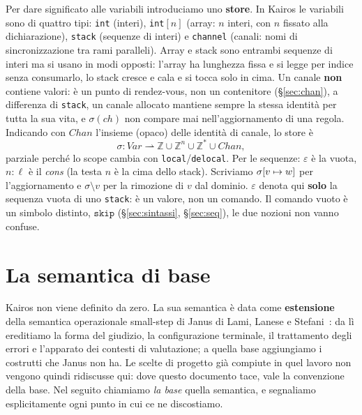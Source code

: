 \noindent
Per dare significato alle variabili introduciamo uno \textbf{store}. In Kairos
le variabili sono di quattro tipi: \texttt{int} (interi), \texttt{int}$[n]$
(array: $n$ interi, con $n$ fissato alla dichiarazione), \texttt{stack}
(sequenze di interi) e \texttt{channel} (canali: nomi di sincronizzazione tra
rami paralleli). Array e stack sono entrambi sequenze di interi ma si usano in
modi opposti: l'array ha lunghezza fissa e si legge per indice senza
consumarlo, lo stack cresce e cala e si tocca solo in cima. Un canale \textbf{non} contiene valori: è un punto di
rendez-vous, non un contenitore (\S\ref{sec:chan}), a differenza di
\texttt{stack}, un canale allocato mantiene sempre la stessa identità per
tutta la sua vita, e $\sigma(\mathit{ch})$ non compare mai
nell'aggiornamento di una regola. Indicando con $\mathit{Chan}$ l'insieme
(opaco) delle identità di canale, lo store è
\[
\sigma : \mathit{Var} \rightharpoonup \mathbb{Z} \cup \mathbb{Z}^{n} \cup \mathbb{Z}^{*} \cup \mathit{Chan},
\]
parziale perché lo scope cambia con \texttt{local}/\texttt{delocal}. Per le
sequenze: $\varepsilon$ è la vuota, $n : \ell$ è il \emph{cons} (la testa $n$
è la cima dello stack). Scriviamo $\sigma[v \mapsto w]$ per l'aggiornamento e
$\sigma \setminus v$ per la rimozione di $v$ dal dominio. $\varepsilon$ denota
qui \textbf{solo} la sequenza vuota di uno \texttt{stack}: è un valore, non un
comando. Il comando vuoto è un simbolo distinto, $\mathtt{skip}$
(\S\ref{sec:sintassi}, \S\ref{sec:seq}), le due nozioni non vanno confuse.

\section{La semantica di base}
\label{sec:base}

Kairos non viene definito da zero. La sua semantica è data come
\textbf{estensione} della semantica operazionale small-step di Janus di Lami,
Lanese e Stefani~\cite{LamiLaneseStefani2024}: da lì ereditiamo la forma del
giudizio, la configurazione terminale, il trattamento degli errori e
l'apparato dei contesti di valutazione; a quella base aggiungiamo i costrutti
che Janus non ha. Le scelte di progetto già compiute in quel lavoro non
vengono quindi ridiscusse qui: dove questo documento tace, vale la convenzione
della base. Nel seguito chiamiamo \emph{la base} quella semantica, e
segnaliamo esplicitamente ogni punto in cui ce ne discostiamo.

